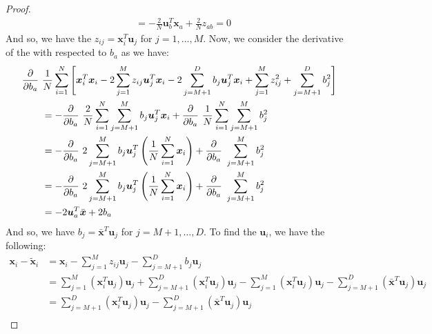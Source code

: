 \begin{proof}
\begin{equation*}
\begin{aligned}
       &= -\frac{2}{N}\boldsymbol u_b^T\boldsymbol x_a + \frac{2}{N}z_{ab} = 0
    \end{aligned}
    \end{equation*}
    And so, we have the $z_{ij} = \boldsymbol x_i^T\boldsymbol u_j$ for $j=1,\dots,M$. Now, we consider the derivative of the with respected to $b_a$ as we have:
    \begin{equation*}
    \begin{aligned}
       \frac{\partial}{\partial b_a} \ &\frac{1}{N}\sum^N_{i=1} \Bigg[\boldsymbol x_i^T\boldsymbol x_i - 2\sum^M_{j=1}z_{ij}\boldsymbol u_j^T\boldsymbol x_i - 2\sum^D_{j=M+1}b_j\boldsymbol u_j^T\boldsymbol x_i + \sum^M_{j=1}z_{ij}^2  +\sum^D_{j=M+1}b_j^2\Bigg] \\ 
       &= -\frac{\partial}{\partial b_a} \ \frac{2}{N}\sum^N_{i=1}\sum^M_{j=M+1}b_j\boldsymbol u_j^T\boldsymbol x_i + \frac{\partial}{\partial b_a} \ \frac{1}{N}\sum^N_{i=1}\sum^M_{j=M+1}b_{j}^2 \\
       &= -\frac{\partial}{\partial b_a} \ 2\sum^M_{j=M+1}b_j\boldsymbol u_j^T\bracka{\frac{1}{N}\sum^N_{i=1}\boldsymbol x_i} + \frac{\partial}{\partial b_a} \ \sum^M_{j=M+1}b_{j}^2 \\
       &= -\frac{\partial}{\partial b_a} \ 2\sum^M_{j=M+1}b_j\boldsymbol u_j^T\bracka{\frac{1}{N}\sum^N_{i=1}\boldsymbol x_i} + \frac{\partial}{\partial b_a} \ \sum^M_{j=M+1}b_{j}^2 \\
       &= -2\boldsymbol u^T_a\bar{\boldsymbol x} + 2b_a
    \end{aligned}
    \end{equation*}
    And so, we have $b_j = \bar{\boldsymbol x}^T\boldsymbol u_j$ for $j=M+1,\dots, D$. To find the $\boldsymbol u_i$, we have the following:
    \begin{equation*}
    \begin{aligned}
        \boldsymbol x_i - \tilde{\boldsymbol x}_i &= \boldsymbol x_i - \sum^M_{j=1}z_{ij}\boldsymbol u_j - \sum^D_{j=M+1}b_j\boldsymbol u_j \\ 
        &= \sum^M_{j=1}(\boldsymbol x_i^T\boldsymbol u_j)\boldsymbol u_j + \sum^D_{j=M+1}(\boldsymbol x_i^T\boldsymbol u_j)\boldsymbol u_j - \sum^M_{j=1}(\boldsymbol x_i^T\boldsymbol u_j)\boldsymbol u_j - \sum^D_{j=M+1}(\bar{\boldsymbol x}^T\boldsymbol u_j)\boldsymbol u_j \\ 
        &= \sum^D_{j=M+1}(\boldsymbol x_i^T\boldsymbol u_j)\boldsymbol u_j - \sum^D_{j=M+1}(\bar{\boldsymbol x}^T\boldsymbol u_j)\boldsymbol u_j \\ 

\end{aligned}
\end{equation*}
\end{proof}
